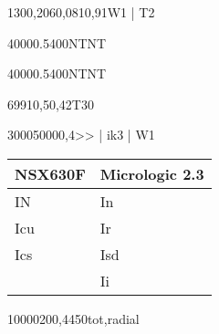 \documentclass[a4paper,oneside,10pt,danish]{report}
\begin{document}
\begin{LV-deltaU}{130}{0,206}{0,081}{0,9}{1}{W1 | T2}
\end{LV-deltaU}



\begin{FraIkTilZcos}{4000}{0.5}{400}{NT}{NT}
\end{FraIkTilZcos}

\begin{FraIkTilZ}{4000}{0.5}{400}{NT}{NT}
\end{FraIkTilZ}

\begin{I-henført}{699}{10,5}{0,42}{T3}{0}
\end{I-henført}

\begin{HV-KBtid-leder}{3000}{5000}{0,4}{>> | ik3 | W1}
\end{HV-KBtid-leder}


\begin{table}
	\begin{tabular}{l|l}
		NSX630F & Micrologic 2.3 \\ \hline
		IN      & In             \\
		Icu     & Ir             \\
		Ics     & Isd            \\
		& Ii            
	\end{tabular}
\end{table}

\begin{HV-lækstrøm-pr-fase}{10000}{20}{0,44}{50}{tot,radial}
\end{HV-lækstrøm-pr-fase}
\end{document}
